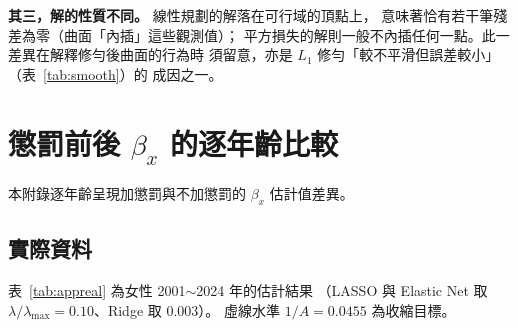 \documentclass[UTF8, fontset=macnew, a4paper, 12pt]{ctexart}
\begin{document}
\textbf{其三，解的性質不同。} 線性規劃的解落在可行域的頂點上，
意味著恰有若干筆殘差為零（曲面「內插」這些觀測值）；
平方損失的解則一般不內插任何一點。此一差異在解釋修勻後曲面的行為時
須留意，亦是 $L_1$ 修勻「較不平滑但誤差較小」（表~\ref{tab:smooth}）的
成因之一。


\section{懲罰前後 $\beta_x$ 的逐年齡比較}

本附錄逐年齡呈現加懲罰與不加懲罰的 $\beta_x$ 估計值差異。

\subsection{實際資料}

表~\ref{tab:appreal} 為女性 2001$\sim$2024 年的估計結果
（LASSO 與 Elastic Net 取 $\lambda/\lambda_{\max}=0.10$、Ridge 取 0.003）。
虛線水準 $1/A=0.0455$ 為收縮目標。
\end{document}
